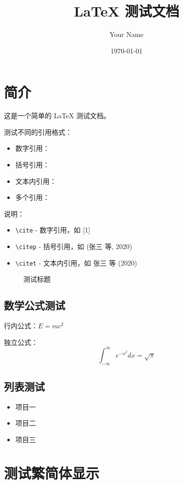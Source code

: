 \documentclass{ctexart}
\title{LaTeX 测试文档}
\author{Your Name}
\date{\today}
\begin{document}
\maketitle

\section{简介}
这是一个简单的 LaTeX \cite{zhang2020deep}测试文档。

测试不同的引用格式：
\begin{itemize}
    \item 数字引用：\cite{zhang2020deep}
    \item 括号引用：\citep{zhang2020deep}
    \item 文本内引用：\citet{zhang2020deep}
    \item 多个引用：\cite{zhang2020deep,knuth1984tex}
\end{itemize}

\noindent 说明：
\begin{itemize}
    \item \texttt{\textbackslash cite} - 数字引用，如 [1]
    \item \texttt{\textbackslash citep} - 括号引用，如 (张三 等, 2020)
    \item \texttt{\textbackslash citet} - 文本内引用，如 张三 等 (2020)
\end{itemize}

\begin{figure}[h]
    \centering
    \fbox{\rule{4cm}{3cm}}  %
    \caption{测试标题}
    \label{fig:test}
\end{figure}

\subsection{数学公式测试}
行内公式：$E = mc^2$

独立公式：
\[
\int_{-\infty}^{\infty} e^{-x^2} dx = \sqrt{\pi}
\]

\subsection{列表测试}
\begin{itemize}
    \item 项目一
    \item 项目二
    \item 项目三
\end{itemize}

\section{测试繁简体显示}
\end{document}
